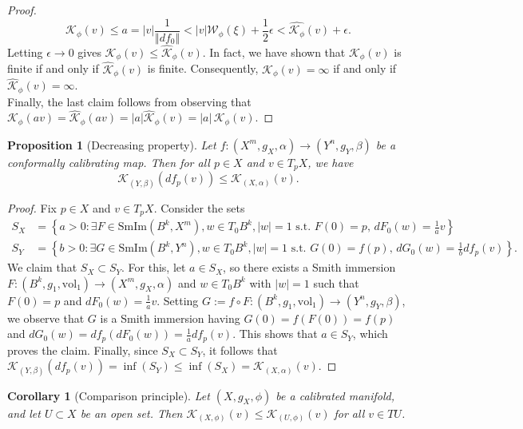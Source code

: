 \documentclass[11pt]{article}
\newcommand{\vol}{\mathrm{vol}}
\newtheorem{prop}[thm]{Proposition}
\newtheorem{cor}[thm]{Corollary}
\theoremstyle{definition}
\numberwithin{equation}{section}
\begin{document}
\begin{proof}
$$\mathcal{K}_\phi(v) \leq a = |v| \frac{1}{\Vert df_0 \Vert} < |v| \mathcal{W}_\phi(\xi) + \frac{1}{2}\epsilon < \widehat{\mathcal{K}_\phi}(v) + \epsilon.$$
Letting $\epsilon \to 0$ gives $\mathcal{K}_\phi(v) \leq \widehat{\mathcal{K}}_\phi(v)$.  In fact, we have shown that  $\mathcal{K}_\phi(v)$ is finite if and only if $\widehat{\mathcal{K}}_\phi(v)$ is finite.  Consequently, $\mathcal{K}_\phi(v) = \infty$ if and only if $\widehat{\mathcal{K}}_\phi(v) = \infty$.   \\
\indent Finally, the last claim follows from observing that $\mathcal{K}_\phi(av) = \widehat{\mathcal{K}}_\phi(av) = \left|a\right| \widehat{\mathcal{K}}_\phi(v) = |a|\,\mathcal{K}_\phi(v)$.
\end{proof}



\begin{prop}[Decreasing property] \label{prop:Dec1} Let $f \colon (X^m, g_X, \alpha) \to (Y^n, g_Y, \beta)$ be a conformally calibrating map.  Then for all $p \in X$ and $v \in T_pX$, we have
$$\mathcal{K}_{(Y,\beta)}(df_p(v)) \leq \mathcal{K}_{(X, \alpha)}(v).$$
\end{prop}

\begin{proof} Fix $p \in X$ and $v \in T_pX$.  Consider the sets
\begin{align*}
S_X & = \left\{ a > 0 \colon \exists F \in \mathrm{SmIm}(B^k, X^m), w \in T_0B^k, |w| = 1 \text{ s.t. } F(0) = p,\, dF_0(w) = \frac{1}{a}v\right\} \\
S_Y & = \left\{ b > 0 \colon \exists G \in \mathrm{SmIm}(B^k, Y^n), w \in T_0B^k, |w| = 1  \text{ s.t. } G(0) = f(p),\, dG_0(w) = \frac{1}{b}df_p(v)\right\}\!.
\end{align*}
We claim that $S_X \subset S_Y$.  For this, let $a \in S_X$, so there exists a Smith immersion $F \colon (B^k, g_1, \vol_1) \to (X^m, g_X, \alpha)$ and $w \in T_0B^k$ with $|w| = 1$ such that $F(0) = p$ and $dF_0(w) = \frac{1}{a}v$.  Setting $G := f \circ F \colon (B^k, g_1, \vol_1) \to (Y^n, g_Y, \beta)$, we observe that $G$ is a Smith immersion having $G(0) = f(F(0)) = f(p)$ and $dG_0(w) = df_p( dF_0(w) ) = \frac{1}{a} df_p(v)$.  This shows that $a \in S_Y$, which proves the claim.  Finally, since $S_X \subset S_Y$, it follows that $\mathcal{K}_{(Y, \beta)}(df_p(v)) = \inf(S_Y) \leq \inf(S_X) = \mathcal{K}_{(X, \alpha)}(v)$.
\end{proof}

\begin{cor}[Comparison principle] \label{cor:Comparison-K} Let $(X, g_X, \phi)$ be a calibrated manifold, and let $U \subset X$ be an open set.  Then $\mathcal{K}_{(X, \phi)}(v) \leq \mathcal{K}_{(U, \phi)}(v)$ for all $v \in TU$.
\end{cor}
\end{document}
